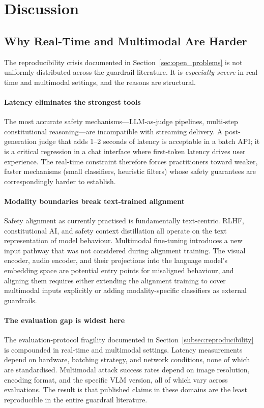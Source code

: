 \section{Discussion}
\label{sec:discussion}

\subsection{Why Real-Time and Multimodal Are Harder}

The reproducibility crisis documented in Section~\ref{sec:open_problems} is not
uniformly distributed across the guardrail literature.
It is \emph{especially severe} in real-time and multimodal settings, and the
reasons are structural.

\paragraph{Latency eliminates the strongest tools}
The most accurate safety mechanisms---LLM-as-judge pipelines, multi-step
constitutional reasoning---are incompatible with streaming delivery.
A post-generation judge that adds 1--2 seconds of latency is acceptable in a batch
API; it is a critical regression in a chat interface where first-token latency
drives user experience.
The real-time constraint therefore forces practitioners toward weaker, faster
mechanisms (small classifiers, heuristic filters) whose safety guarantees are
correspondingly harder to establish.

\paragraph{Modality boundaries break text-trained alignment}
Safety alignment as currently practised is fundamentally text-centric.
RLHF, constitutional AI, and safety context distillation all operate on the
text representation of model behaviour.
Multimodal fine-tuning introduces a new input pathway that was not considered
during alignment training.
The visual encoder, audio encoder, and their projections into the language model's
embedding space are potential entry points for misaligned behaviour, and aligning
them requires either extending the alignment training to cover multimodal inputs
explicitly or adding modality-specific classifiers as external guardrails.

\paragraph{The evaluation gap is widest here}
The evaluation-protocol fragility documented in Section~\ref{subsec:reproducibility}
is compounded in real-time and multimodal settings.
Latency measurements depend on hardware, batching strategy, and network conditions,
none of which are standardised.
Multimodal attack success rates depend on image resolution, encoding format, and
the specific VLM version, all of which vary across evaluations.
The result is that published claims in these domains are the least reproducible
in the entire guardrail literature.

